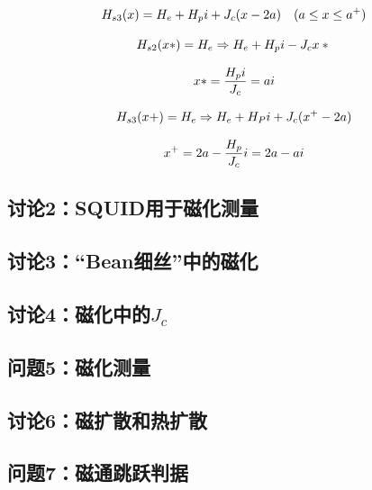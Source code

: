 \begin{equation}%
H_{s3}(x)=H_{e}+H_{p}i+J_{c}(x-2a)\quad(a\leq x\leq a^{+})\\
\end{equation}

\begin{equation}%
H_{s2}(x*)=H_{e}\Rightarrow H_{e}+H_{p}i-J_{c}x*\\
\end{equation}

\begin{equation}%
x*=\frac{H_{p}i}{J_{c}}=ai\\
\end{equation}

\begin{equation}%
H_{s3}(x+)=H_{e}\Rightarrow H_{e}+H_{P}i+J_{c}(x^{+}-2a)\\
\end{equation}

\begin{equation}%
x^{+}=2a-\frac{H_{p}}{J_{c}}i=2a-ai\\
\end{equation}




\newpage
\subsection{讨论2：SQUID用于磁化测量}

\newpage
\subsection{讨论3：“Bean细丝”中的磁化}

\newpage
\subsection{讨论4：磁化中的$J_c$}

\newpage
\subsection{问题5：磁化测量}

\newpage
\subsection{讨论6：磁扩散和热扩散}

\newpage
\subsection{问题7：磁通跳跃判据}

